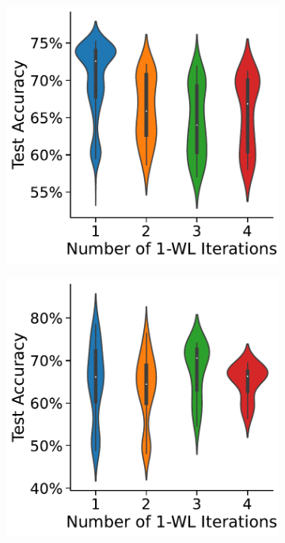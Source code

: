\begin{figure}[thb]
\begin{subfigure}[b]{0.19\textwidth}
        \caption{\scriptsize\nci}
	\end{subfigure}
	\hfill
	\begin{subfigure}[b]{0.19\textwidth}
		\centering
		\includegraphics[width=\textwidth]{Figures/k_wl_violin_PROTEINS.pdf}
        \caption{\scriptsize\proteins}
	\end{subfigure}
	\par\bigskip
	\begin{subfigure}[b]{0.19\textwidth}
		\centering
		\includegraphics[width=\textwidth]{Figures/k_wl_violin_REDDIT-BINARY.pdf}

\end{subfigure}
\end{figure}
